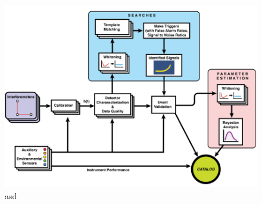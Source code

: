 \begin{figure}
  \includegraphics[width=\textwidth]{img/1_introduction/data_processing.png}
  \caption{asd}
  \label{fig:1_data_processing}
  \centering
\end{figure}



